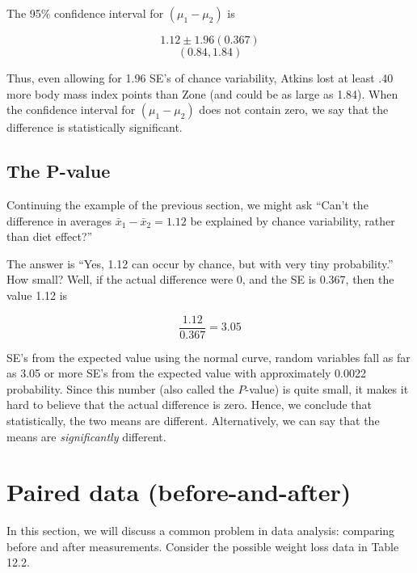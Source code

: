 \documentclass[11pt, chapterprefix=true]{scrbook}\usepackage[]{graphicx}\usepackage[]{color}
\begin{document}
The 95\% confidence interval for $(\mu_1 - \mu_2)$ is

\begin{equation*}
  1.12 \pm 1.96 (0.367)
\end{equation*}
\begin{equation*}
(0.84, 1.84)
\end{equation*}

Thus, even allowing for 1.96 SE's of chance variability, Atkins lost at least .40 more body mass index points than Zone (and could be as large as 1.84).   When the confidence interval for $(\mu_1 - \mu_2)$  does not contain zero, we say that the difference is statistically significant.  

\subsection{The P-value}

Continuing the example of the previous section, we might ask ``Can't the difference in averages $\bar{x}_1 - \bar{x}_2 = 1.12$ be explained by chance variability, rather than diet effect?''

The answer is ``Yes, 1.12 can occur by chance, but with very tiny probability.''  How small? Well, if the actual difference were 0, and the SE is 0.367, then the value 1.12 is

\begin{equation*}
\frac{1.12}{0.367} = 3.05
\end{equation*}

SE's from the expected value using the normal curve, random variables fall as far as 3.05 or more SE's from the expected value with approximately 0.0022 probability.  Since this number (also called the $P$-value) is quite small, it makes it hard to believe that the actual difference is zero.  Hence, we conclude that statistically, the two means are different.  Alternatively, we can say that the means are \textit{significantly} different.


\section{Paired data (before-and-after)}

In this section, we will discuss a common problem in data analysis: comparing before and after measurements.  Consider the possible weight loss data in Table 12.2.
\end{document}
